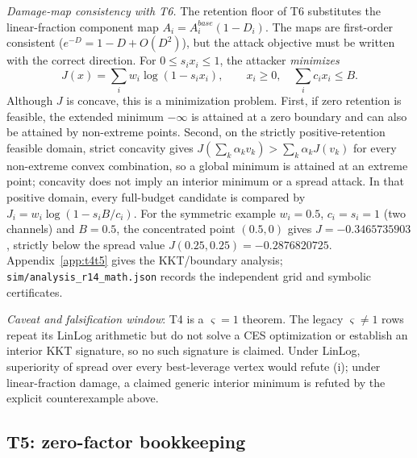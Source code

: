 \emph{Damage-map consistency with T6.} The retention floor of T6 substitutes
the linear-fraction component map $A_i=A_i^{base}(1-D_i)$. The maps are
first-order consistent ($e^{-D}=1-D+O(D^2)$), but the attack objective must be
written with the correct direction. For $0\le s_ix_i\le1$, the attacker
\emph{minimizes}
\[
J(x)=\sum_iw_i\log(1-s_ix_i),\qquad x_i\ge0,\quad \sum_i c_ix_i\le B.
\]
Although $J$ is concave, this is a minimization problem. First, if zero
retention is feasible, the extended minimum $-\infty$ is attained at a zero
boundary and can also be attained by non-extreme points. Second, on the
strictly positive-retention feasible domain, strict concavity gives
$J(\sum_k\alpha_kv_k)>\sum_k\alpha_kJ(v_k)$ for every non-extreme convex
combination, so a global minimum is attained at an extreme point; concavity
does not imply an interior minimum or a spread attack. In that positive domain,
every full-budget candidate is compared by $J_i=w_i\log(1-s_iB/c_i)$.
For the symmetric example $w_i=0.5$, $c_i=s_i=1$ (two channels) and $B=0.5$, the
concentrated point $(0.5,0)$ gives $J=-0.3465735903$, strictly below the
spread value $J(0.25,0.25)=-0.2876820725$. Appendix~\ref{app:t4t5} gives the
KKT/boundary analysis; \texttt{sim/analysis\_r14\_math.json} records the
independent grid and symbolic certificates.

\emph{Caveat and falsification window}: T4 is a $\varsigma=1$ theorem. The
legacy $\varsigma\neq1$ rows repeat its LinLog arithmetic but do not solve a
CES optimization or establish an interior KKT signature, so no such signature
is claimed. Under LinLog, superiority of spread over every best-leverage
vertex would refute (i); under linear-fraction damage, a claimed generic
interior minimum is refuted by the explicit counterexample above.

\subsection{T5: zero-factor bookkeeping}\label{sec:t5}

